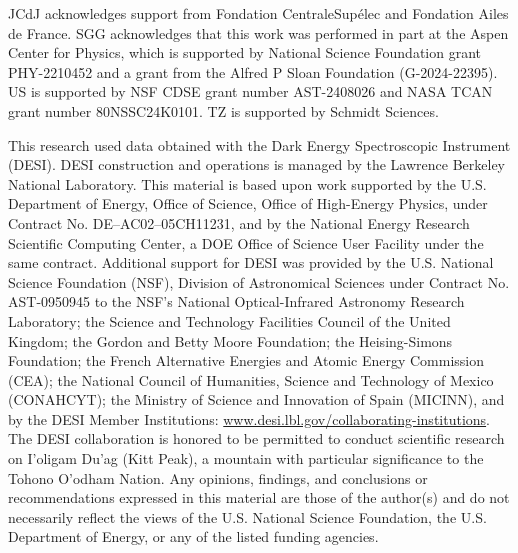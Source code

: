 \acknowledgments
\label{sec:acknowledgements}

\hspace{0.85cm}JCdJ acknowledges support from Fondation CentraleSupélec and Fondation Ailes de France. SGG acknowledges that this work was performed in part at the Aspen Center for Physics, which is supported by National Science Foundation grant PHY-2210452 and a grant from the Alfred P Sloan Foundation (G-2024-22395). US is supported by NSF CDSE grant number AST-2408026 and NASA TCAN grant number 80NSSC24K0101. TZ is supported by Schmidt Sciences.
 
This research used data obtained with the Dark Energy Spectroscopic Instrument (DESI). DESI construction and operations is managed by the Lawrence Berkeley National Laboratory. This material is based upon work supported by the U.S. Department of Energy, Office of Science, Office of High-Energy Physics, under Contract No. DE–AC02–05CH11231, and by the National Energy Research Scientific Computing Center, a DOE Office of Science User Facility under the same contract. Additional support for DESI was provided by the U.S. National Science Foundation (NSF), Division of Astronomical Sciences under Contract No. AST-0950945 to the NSF’s National Optical-Infrared Astronomy Research Laboratory; the Science and Technology Facilities Council of the United Kingdom; the Gordon and Betty Moore Foundation; the Heising-Simons Foundation; the French Alternative Energies and Atomic Energy Commission (CEA); the National Council of Humanities, Science and Technology of Mexico (CONAHCYT); the Ministry of Science and Innovation of Spain (MICINN), and by the DESI Member Institutions: \url{www.desi.lbl.gov/collaborating-institutions}. The DESI collaboration is honored to be permitted to conduct scientific research on I’oligam Du’ag (Kitt Peak), a mountain with particular significance to the Tohono O’odham Nation. Any opinions, findings, and conclusions or recommendations expressed in this material are those of the author(s) and do not necessarily reflect the views of the U.S. National Science Foundation, the U.S. Department of Energy, or any of the listed funding agencies.

